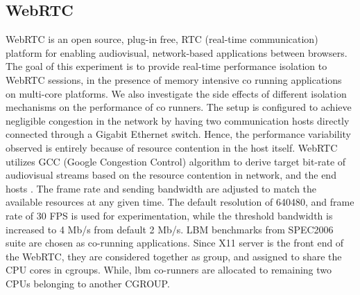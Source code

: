 \documentclass[times, 10pt,onecolumn]{article}
\begin{document}
\subsection{WebRTC}
WebRTC is an open source, plug-in free, RTC (real-time communication)
platform for enabling audiovisual, network-based applications between
browsers. The goal of this experiment is to provide real-time
performance isolation to WebRTC sessions, in the presence of memory
intensive co running applications on multi-core platforms. We also
investigate the side effects of different isolation mechanisms on the
performance of co runners. The setup is configured to achieve
negligible congestion in the network by having two communication hosts
directly connected through a Gigabit Ethernet switch. Hence, the
performance variability observed is entirely because of resource
contention in the host itself. WebRTC utilizes GCC (Google Congestion
Control) algorithm to derive target bit-rate of audiovisual streams
based on the resource contention in network, and the end hosts
\cite{ccm2013webrtc}. The frame rate and sending bandwidth are
adjusted to match the available resources at any given time. The
default resolution of 640480, and frame rate of 30 FPS is used
for experimentation, while the threshold bandwidth is increased to 4
Mb/s from default 2 Mb/s. LBM benchmarks from SPEC2006 suite are
chosen as co-running applications. Since X11 server is the front end
of the WebRTC, they are considered together as group, and assigned to
share the CPU cores in cgroups. While, lbm co-runners are allocated to
remaining two CPUs belonging to another CGROUP.
\end{document}

